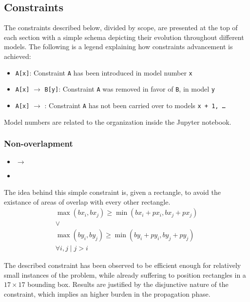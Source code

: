\documentclass[a4paper,10pt]{article}
\newcommand{\xmark}{\ding{55}}%
\newcounter{subsubsubsection}[subsubsection]
\begin{document}
\subsection{Constraints}
The constraints described below, divided by scope, are presented at the top of each section with a simple schema depicting their evolution throughout different models.
The following is a legend explaining how constraints advancement is achieved:
\begin{itemize}
   \item \texttt{A[x]}: Constraint \texttt{A} has been introduced in model number \texttt{x}
   \item \texttt{A[x]} $\rightarrow$ \texttt{B[y]}: Constraint \texttt{A} was removed in favor of \texttt{B}, in model \texttt{y}
   \item \texttt{A[x]} $\rightarrow$ \xmark: Constraint \texttt{A} has not been carried over to models \texttt{x + 1, \dots}
\end{itemize}
Model numbers are related to the organization inside the Jupyter notebook.

\subsubsection{Non-overlapment}
\begin{itemize}
   \item {} $\rightarrow$ 
   \item {}
\end{itemize}

 \label{sec:presents-cannot-overlap}
The idea behind this simple constraint is, given a rectangle, to avoid the existance of areas of overlap with every other rectangle.
\begin{gather*}
   \max({bx_{i}, bx_{j}}) \geq \min({bx_{i} + px_{i}, bx_{j} + px_{j}}) \\
   \vee \\
   \max({by_{i}, by_{j}}) \geq \min({by_{i} + py_{i}, by_{j} + py_{j}}) \\
   \forall{i, j \mid j > i}
\end{gather*}

The described constraint has been observed to be efficient enough for relatively small instances of the problem, while already suffering to position rectangles in a $17 \times 17$ bounding box. Results are justified by the disjunctive nature of the constraint, which implies an higher burden in the propagation phase.
\end{document}
